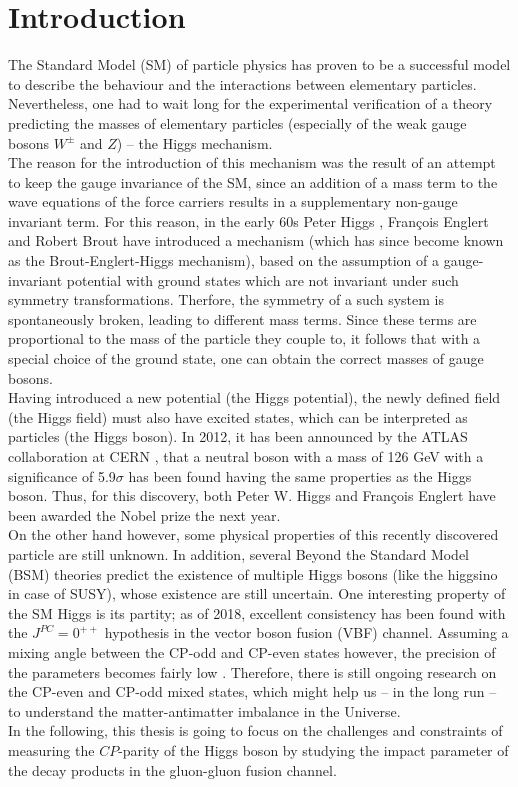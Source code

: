 \chapter{Introduction} %

\label{Chapter1} %

The Standard Model (SM) of particle physics has proven to be a successful model to describe the behaviour and the interactions between elementary particles. Nevertheless, one had to wait long for the experimental verification of a theory predicting the masses of elementary particles (especially of the weak gauge bosons $W^\pm$ and $Z$) -- the Higgs mechanism.\\
The reason for the introduction of this mechanism was the result of an attempt to keep the gauge invariance of the SM, since an addition of a mass term to the wave equations of the force carriers results in a supplementary non-gauge invariant term. For this reason, in the early 60s Peter Higgs \parencite{Reference1}, François Englert and Robert Brout \parencite{Reference2} have introduced a mechanism (which has since become known as the Brout-Englert-Higgs mechanism), based on the assumption of a gauge-invariant potential with ground states which are not invariant under such symmetry transformations. Therfore, the symmetry of a such system is spontaneously broken, leading to different mass terms. Since these terms are proportional to the mass of the particle they couple to, it follows that with a special choice of the ground state, one can obtain the correct masses of gauge bosons.\\
Having introduced a new potential (the Higgs potential), the newly defined field (the Higgs field) must also have excited states, which can be interpreted as particles (the Higgs boson). In 2012, it has been announced by the ATLAS collaboration at CERN \parencite{Reference3}, that a neutral boson with a mass of 126 GeV with a significance of 5.9$\sigma$ has been found having the same properties as the Higgs boson. Thus, for this discovery, both Peter W. Higgs and François Englert have been awarded the Nobel prize the next year.\\
On the other hand however, some physical properties of this recently discovered particle are still unknown. In addition, several Beyond the Standard Model (BSM) theories predict the existence of multiple Higgs bosons (like the higgsino in case of SUSY), whose existence are still uncertain. One interesting property of the SM Higgs is its partity; as of 2018, excellent consistency has been found with the $J^{PC} = 0^{++}$ hypothesis \parencite{PDG_source} in the vector boson fusion (VBF) channel. Assuming a mixing angle between the CP-odd and CP-even states however, the precision of the parameters becomes fairly low \parencite{PDG}. Therefore, there is still ongoing research on the CP-even and CP-odd mixed states, which might help us -- in the long run -- to understand the matter-antimatter imbalance in the Universe.\\
In the following, this thesis is going to focus on the challenges and constraints of measuring the $CP$-parity of the Higgs boson by studying the impact parameter of the decay products in the gluon-gluon fusion channel.\\